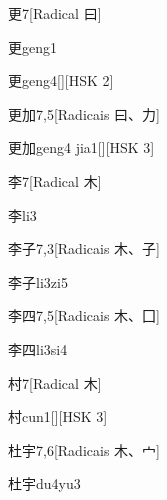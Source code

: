 \begin{entry}{更}{7}[Radical ⽈]
  \begin{phonetics}{更}{geng1}
  \end{phonetics}
  \begin{phonetics}{更}{geng4}[][HSK 2]
  \end{phonetics}
\end{entry}

\begin{entry}{更加}{7,5}[Radicais ⽈、⼒]
  \begin{phonetics}{更加}{geng4 jia1}[][HSK 3]
  \end{phonetics}
\end{entry}

\begin{entry}{李}{7}[Radical ⽊]
  \begin{phonetics}{李}{li3}
  \end{phonetics}
\end{entry}

\begin{entry}{李子}{7,3}[Radicais ⽊、⼦]
  \begin{phonetics}{李子}{li3zi5}
  \end{phonetics}
\end{entry}

\begin{entry}{李四}{7,5}[Radicais ⽊、⼞]
  \begin{phonetics}{李四}{li3si4}
  \end{phonetics}
\end{entry}

\begin{entry}{村}{7}[Radical ⽊]
  \begin{phonetics}{村}{cun1}[][HSK 3]
  \end{phonetics}
\end{entry}

\begin{entry}{杜宇}{7,6}[Radicais ⽊、⼧]
  \begin{phonetics}{杜宇}{du4yu3}
  \end{phonetics}
\end{entry}

